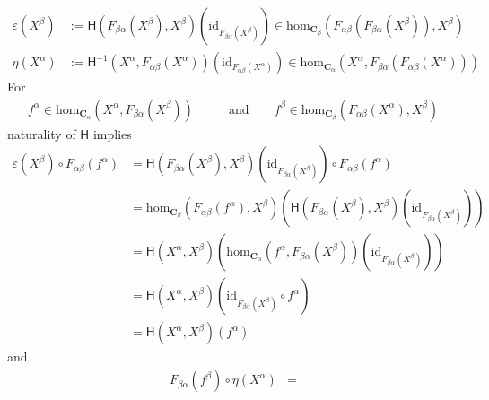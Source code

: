 \begin{prf}
\begin{align*}
  \varepsilon(X^{\beta})
  &:=
  \mathsf{H}
  \left(
    F_{\beta\alpha}(X^{\beta}),
    X^{\beta}
  \right)
  \left(
    \mathrm{id}_{F_{\beta\alpha}(X^{\beta})}
  \right)
  \in
  \mathrm{hom}_{\mathbf{C}_{\beta}}
  \left(
    F_{\alpha\beta}
    \left(
      F_{\beta\alpha}(X^{\beta})
    \right),
    X^{\beta}
  \right)
  \\
  \eta(X^{\alpha})
  &:=
  \mathsf{H}^{-1}
  \left(
    X^{\alpha},
    F_{\alpha\beta}(X^{\alpha})
  \right)
  \left(
    \mathrm{id}_{F_{\alpha\beta}(X^{\alpha})}
  \right)
  \in
  \mathrm{hom}_{\mathbf{C}_{\alpha}}
  \left(
    X^{\alpha},
    F_{\beta\alpha}
    \left(
      F_{\alpha\beta}(X^{\alpha})
    \right)
  \right)
\end{align*}
For
\begin{align*}
  f^{\alpha}
  \in
  \mathrm{hom}_{\mathbf{C}_{\alpha}}
  \left(
    X^{\alpha},
    F_{\beta\alpha}(X^{\beta})
  \right)
  \qquad
  &\text{and}
  \qquad
  f^{\beta}
  \in
  \mathrm{hom}_{\mathbf{C}_{\beta}}
  \left(
    F_{\alpha\beta}(X^{\alpha}),
    X^{\beta}
  \right)
\end{align*}
naturality of $\mathsf{H}$ implies
\begin{align*}
  \varepsilon(X^{\beta})
  \circ
  F_{\alpha\beta}(f^{\alpha})
  &=
  \mathsf{H}
  \left(
    F_{\beta\alpha}(X^{\beta}),
    X^{\beta}
  \right)
  \left(
    \mathrm{id}_{F_{\beta\alpha}(X^{\beta})}
  \right)
  \circ
  F_{\alpha\beta}(f^{\alpha})
  \\
  &=
  \mathrm{hom}_{\mathbf{C}_{\beta}}
  \left(
    F_{\alpha\beta}(f^{\alpha}),
    X^{\beta}
  \right)
  \left(
    \mathsf{H}
    \left(
      F_{\beta\alpha}(X^{\beta}),
      X^{\beta}
    \right)
    \left(
      \mathrm{id}_{F_{\beta\alpha}(X^{\beta})}
    \right)
  \right)
  \\
  &=
  \mathsf{H}(X^{\alpha},X^{\beta})
  \left(
    \mathrm{hom}_{\mathbf{C}_{\alpha}}
    \left(
      f^{\alpha},
      F_{\beta\alpha}(X^{\beta})
    \right)
    \left(
      \mathrm{id}_{F_{\beta\alpha}(X^{\beta})}
    \right)
  \right)
  \tag{NT}
  \\
  &=
  \mathsf{H}(X^{\alpha},X^{\beta})
  \left(
    \mathrm{id}_{F_{\beta\alpha}(X^{\beta})}
    \circ
    f^{\alpha}
  \right)
  \\
  &=
  \mathsf{H}(X^{\alpha},X^{\beta})(f^{\alpha})
\end{align*}
and
\begin{align*}
  F_{\beta\alpha}(f^{\beta})
  \circ
  \eta(X^{\alpha})
  &=

\end{align*}
\end{prf}
